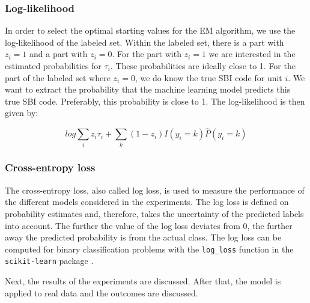 \documentclass[12pt, a4paper, titlepage]{article}
\begin{document}
\subsubsection{Log-likelihood}
In order to select the optimal starting values for the EM algorithm, we use the log-likelihood of the labeled set. Within the labeled set, there is a part with $z_i = 1$ and a part with $z_i = 0$. For the part with $z_i = 1$ we are interested in the estimated probabilities for $\tau_i$. These probabilities are ideally close to 1. For the part of the labeled set where $z_i = 0$, we do know the true SBI code for unit $i$. We want to extract the probability that the machine learning model predicts this true SBI code. Preferably, this probability is close to 1.
The log-likelihood is then given by:

						\begin{equation}\label{log}
log \sum_i z_i \tau_i + \sum_k (1-z_i)I(y_i = k)\hat{P}(y_i=k)
						\end{equation}

\subsubsection{Cross-entropy loss}
The cross-entropy loss, also called log loss, is used to measure the performance of the different models considered in the experiments. The log loss is defined on probability estimates and, therefore, takes the uncertainty of the predicted labels into account. The further the value of the log loss deviates from 0, the further away the predicted probability is from the actual class. The log loss can be computed for binary classification problems with the \texttt{log\_loss} function in the \texttt{scikit-learn} package \citep{sklearn}. 


\bigskip

Next, the results of the experiments are discussed. After that, the model is applied to real data and the outcomes are discussed.


\clearpage %

 

\end{document}
